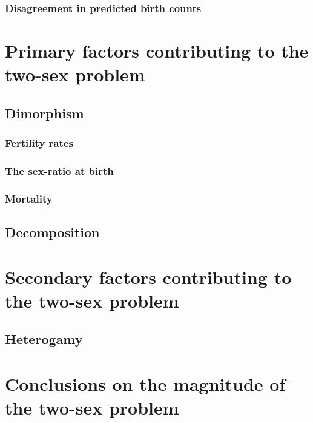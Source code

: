         \subsubsection{Disagreement in predicted birth counts}
          
  \section{Primary factors contributing to the two-sex problem}
    \subsection{Dimorphism}
      
      \subsubsection{Fertility rates}
        
      \subsubsection{The sex-ratio at birth}
        
      \subsubsection{Mortality}
        
    \subsection{Decomposition}
       
  \section{Secondary factors contributing to the two-sex problem}
      
    \subsection{Heterogamy}
       
  \section{Conclusions on the magnitude of the two-sex problem}
      
